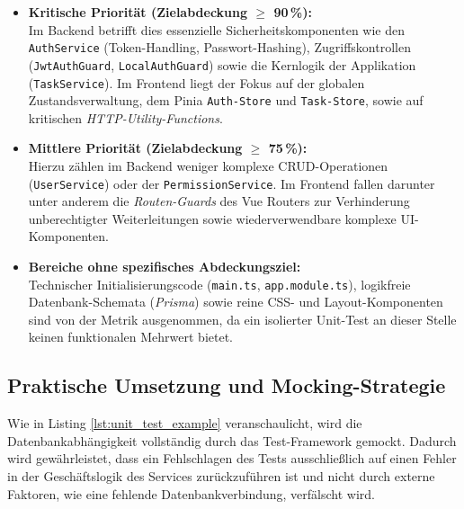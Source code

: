 \begin{itemize}
    \item \textbf{Kritische Priorität (Zielabdeckung $\ge$ 90\,\%):}\\
    Im Backend betrifft dies essenzielle Sicherheitskomponenten wie den \texttt{AuthService} (Token-Handling, Passwort-Hashing), Zugriffskontrollen (\texttt{JwtAuthGuard}, \texttt{LocalAuthGuard}) sowie die Kernlogik der Applikation (\texttt{TaskService}). Im Frontend liegt der Fokus auf der globalen Zustandsverwaltung, dem Pinia \texttt{Auth-Store} und \texttt{Task-Store}, sowie auf kritischen \textit{HTTP-Utility-Functions}.
    
    \item \textbf{Mittlere Priorität (Zielabdeckung $\ge$ 75\,\%):}\\
    Hierzu zählen im Backend weniger komplexe CRUD-Operationen (\texttt{UserService}) oder der \texttt{PermissionService}. Im Frontend fallen darunter unter anderem die \textit{Routen-Guards} des Vue Routers zur Verhinderung unberechtigter Weiterleitungen sowie wiederverwendbare komplexe UI-Komponenten.
    
    \item \textbf{Bereiche ohne spezifisches Abdeckungsziel:}\\
    Technischer Initialisierungscode (\texttt{main.ts}, \texttt{app.module.ts}), logikfreie Datenbank-Schemata (\textit{Prisma}) sowie reine CSS- und Layout-Komponenten sind von der Metrik ausgenommen, da ein isolierter Unit-Test an dieser Stelle keinen funktionalen Mehrwert bietet.
\end{itemize}

\subsection{Praktische Umsetzung und Mocking-Strategie}
Wie in Listing \ref{lst:unit_test_example} veranschaulicht, wird die Datenbankabhängigkeit vollständig durch das Test-Framework gemockt. Dadurch wird gewährleistet, dass ein Fehlschlagen des Tests ausschließlich auf einen Fehler in der Geschäftslogik des Services zurückzuführen ist und nicht durch externe Faktoren, wie eine fehlende Datenbankverbindung, verfälscht wird.

